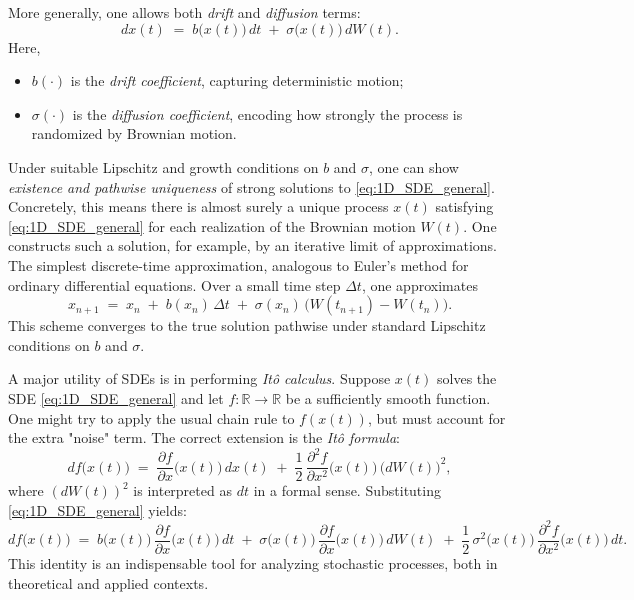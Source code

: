 \documentclass[letterpaper,11pt,oneside,reqno]{article}
\numberwithin{equation}{section}
\theoremstyle{definition}
\begin{document}
\medskip
More generally, one allows both \emph{drift} and \emph{diffusion} terms:
\begin{equation}
\label{eq:1D_SDE_general}
dx(t) \;=\; b\bigl(x(t)\bigr)\,dt \;+\; \sigma\bigl(x(t)\bigr)\,dW(t).
\end{equation}
Here,
\begin{itemize}
\item \(b(\cdot)\) is the \emph{drift coefficient}, capturing deterministic motion;
\item \(\sigma(\cdot)\) is the \emph{diffusion coefficient}, encoding how strongly the process is randomized by Brownian motion.
\end{itemize}
Under suitable Lipschitz and growth conditions on \(b\) and \(\sigma\), one can show \emph{existence and pathwise uniqueness} of strong solutions to \eqref{eq:1D_SDE_general}. Concretely, this means there is almost surely a unique process \(x(t)\) satisfying \eqref{eq:1D_SDE_general} for each realization of the Brownian motion \(W(t)\). One constructs such a solution, for example, by an iterative limit of approximations.
The simplest discrete-time approximation, analogous to Euler’s method for ordinary differential equations. Over a small time step \(\Delta t\), one approximates
\[
x_{n+1} \;=\; x_n \;+\; b(x_n)\,\Delta t \;+\; \sigma(x_n)\,\bigl(W(t_{n+1}) - W(t_n)\bigr).
\]
This scheme converges to the true solution pathwise under standard Lipschitz conditions on \(b\) and \(\sigma\).


\medskip
A major utility of SDEs is in performing \emph{It\^{o} calculus}. Suppose \(x(t)\) solves the SDE \eqref{eq:1D_SDE_general} and let \(f\colon\mathbb{R}\to\mathbb{R}\) be a sufficiently smooth function. One might try to apply the usual chain rule to \(f(x(t))\), but must account for the extra "noise" term. The correct extension is the \emph{It\^{o} formula}:
\[
df\bigl(x(t)\bigr)
\;=\;
\frac{\partial f}{\partial x}\bigl(x(t)\bigr)\,dx(t)
\;+\;\frac12\,
\frac{\partial^2 f}{\partial x^2}\bigl(x(t)\bigr)\,\bigl(dW(t)\bigr)^2,
\]
where \((dW(t))^2\) is interpreted as \(dt\) in a formal sense. Substituting \eqref{eq:1D_SDE_general} yields:
\[
df\bigl(x(t)\bigr)
\;=\;
b\bigl(x(t)\bigr)\,\frac{\partial f}{\partial x}\bigl(x(t)\bigr)\,dt
\;+\;
\sigma\bigl(x(t)\bigr)\,\frac{\partial f}{\partial x}\bigl(x(t)\bigr)\,dW(t)
\;+\;
\frac12\,\sigma^2\bigl(x(t)\bigr)\,\frac{\partial^2 f}{\partial x^2}\bigl(x(t)\bigr)\,dt.
\]
This identity is an indispensable tool for analyzing stochastic processes, both in theoretical and applied contexts.
\end{document}
